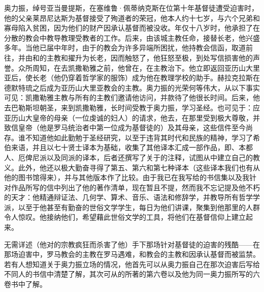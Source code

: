 奥力振，绰号亚当曼提斯，在塞维鲁·佩蒂纳克斯在位第十年基督徒遭受迫害时，他的父亲莱昂尼达斯为基督接受了殉道者的荣冠，他本人约十七岁，与六个兄弟和寡母陷入贫困，因为他们的财产因承认基督而被没收。年仅十八岁时，他承担了在分散的教会中教导教理受教者的工作。后来，由该城主教任命，接替长老，他兴盛多年。当他已届中年时，由于的教会为许多异端所困扰，他持教会信函，取道前往，并由和的主教和擢升为长老，因而触怒了，他狂怒至极，到处写信损害他的声誉。众所周知，在去凯撒勒雅之前，他曾在，在主教治下。他立即返回亚历山大里亚后，使长老（他仍穿着哲学家的服饰）成为他在教理学校的助手。赫拉克拉斯在德默特琉之后成为亚历山大里亚教会的主教。奥力振的光荣何等伟大，从以下事实可见：凯撒勒雅主教与所有的主教们邀请他访问，并款待了他很长时间。后来，他去巴勒斯坦朝圣，来到凯撒勒雅，长时间受教于奥力振，学习圣经。也可见于：应亚历山大皇帝的母亲（一位虔诚的妇人）的请求，他去，在那里受到极大尊敬，并致信皇帝（他是罗马统治者中第一位成为基督徒的）及其母亲，这些信件至今尚存。谁不知道他如此勤勉于圣经研究，以至于违背其时代和民族的精神，学习了希伯来语，并且以七十贤士译本为基础，收集了其他译本汇成一部作品，即、本都人、厄俾尼派以及同派的译本，后者还撰写了关于的注释，试图从中建立自己的教义。此外，他还以极大勤奋寻得了第五、第六和第七种译本（这些译本我们也有从他的图书馆得来），并与其他版本作了比较。由于我已在我写给的书信集以及我针对作品所写的信中列出了他的著作清单，现在暂且不提，然而我不忘记提及他不朽的天才：他精通辩证法、几何学、算术、音乐、语法和修辞学，并教导所有哲学学派，以至于他甚至有勤奋的世俗文学学生，每日为他们讲课，聚集到他那里的人群令人惊叹。他接纳他们，希望藉此世俗文学的工具，将他们在基督信仰上建立起来。\par

无需详述（他对的宗教疯狂而杀害了他）手下那场针对基督徒的迫害的残酷——在那场迫害中，罗马教会的主教在罗马遇难，和教会的主教和因承认基督而被监禁。若有人想知道关于奥力振立场的情况，他首先可以从奥力振自己在那次迫害后写给不同人的书信中清楚了解，其次可从的所著的第六卷以及他为同一奥力振所写的六卷书中了解。\par

